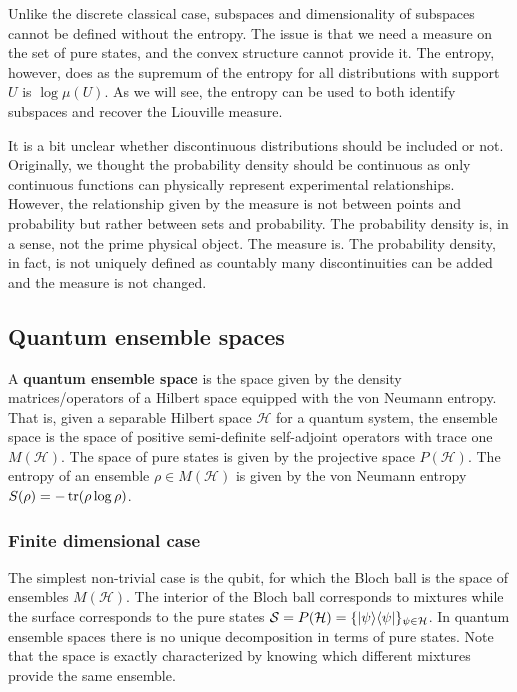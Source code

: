 Unlike the discrete classical case, subspaces and dimensionality of subspaces cannot be defined without the entropy. The issue is that we need a measure on the set of pure states, and the convex structure cannot provide it. The entropy, however, does as the supremum of the entropy for all distributions with support $U$ is $\log \mu(U)$. As we will see, the entropy can be used to both identify subspaces and recover the Liouville measure.

It is a bit unclear whether discontinuous distributions should be included or not. Originally, we thought the probability density should be continuous as only continuous functions can physically represent experimental relationships. However, the relationship given by the measure is not between points and probability but rather between sets and probability. The probability density is, in a sense, not the prime physical object. The measure is. The probability density, in fact, is not uniquely defined as countably many discontinuities can be added and the measure is not changed.

\subsection{Quantum ensemble spaces}

\begin{defn}
	A \textbf{quantum ensemble space} is the space given by the density matrices/operators of a Hilbert space equipped with the von Neumann entropy. That is, given a separable Hilbert space $\mathcal{H}$ for a quantum system, the ensemble space is the space of positive semi-definite self-adjoint operators with trace one $M(\mathcal{H})$. The space of pure states is given by the projective space $P(\mathcal{H})$. The entropy of an ensemble $\rho \in M(\mathcal{H})$ is given by the von Neumann entropy $S(\rho) = -\operatorname{tr}(\rho \log \rho)$.
\end{defn}

\subsubsection{Finite dimensional case}

The simplest non-trivial case is the qubit, for which the Bloch ball is the space of ensembles $M(\mathcal{H})$. The interior of the Bloch ball corresponds to mixtures  while the surface corresponds to the pure states $\mathcal{S} = P(\mathcal{H}) = \{ |\psi\rangle \langle\psi| \}_{\psi \in \mathcal{H}}$. In quantum ensemble spaces there is no unique decomposition in terms of pure states. Note that the space is exactly characterized by knowing which different mixtures provide the same ensemble.

